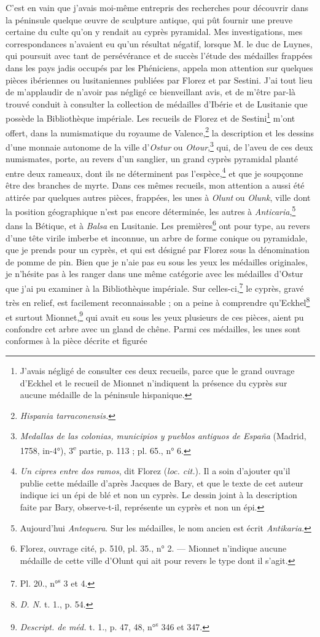 \documentclass{article}
\begin{document}
C'est en vain que j'avais moi-même entrepris des recherches pour découvrir dans la péninsule quelque œuvre de sculpture antique, qui pût fournir une preuve certaine du culte qu'on y rendait au cyprès pyramidal. Mes investigations, mes correspondances n'avaient eu qu'un résultat négatif, lorsque M. le duc de Luynes, qui poursuit avec tant de persévérance et de succès l'étude des médailles frappées dans les pays jadis occupés par les Phéniciens, appela mon attention sur quelques pièces ibériennes ou lusitaniennes publiées par Florez et par Sestini. J'ai tout lieu de m'applaudir de n'avoir pas négligé ce bienveillant avis, et de m'être par-là trouvé conduit à consulter la collection de médailles d'Ibérie et de Lusitanie que possède la Bibliothèque impériale. Les recueils de Florez et de Sestini\footnote{J'avais négligé de consulter ces deux recueils, parce que le grand ouvrage d'Eckhel et le recueil de Mionnet n'indiquent la présence du cyprès sur aucune médaille de la péninsule hispanique.} m'ont offert, dans la numismatique du royaume de Valence,\footnote{\emph{Hispania tarraconensis.}} la description et les dessins d'une monnaie autonome de la ville d'\emph{Ostur} ou \emph{Otour},\footnote{\emph{Medallas de las colonias, municipios y pueblos antiguos de España} (Madrid, 1758, in-4°), 3\textsuperscript{e} partie, p. 113 ; pl. 65., n° 6.} qui, de l'aveu de ces deux numismates, porte, au revers d'un sanglier, un grand cyprès pyramidal planté entre deux rameaux, dont ils ne déterminent pas l'espèce,\footnote{\emph{Un cipres entre dos ramos}, dit Florez (\emph{loc. cit.}). Il a soin d'ajouter qu'il publie cette médaille d'après Jacques de Bary, et que le texte de cet auteur indique ici un épi de blé et non un cyprès. Le dessin joint à la description faite par Bary, observe-t-il, représente un cyprès et non un épi.} et que je soupçonne être des branches de myrte. Dans ces mêmes recueils, mon attention a aussi été attirée par quelques autres pièces, frappées, les unes à \emph{Olunt} ou \emph{Olunk}, ville dont la position géographique n'est pas encore déterminée, les autres à \emph{Anticaria},\footnote{Aujourd'hui \emph{Antequera}. Sur les médailles, le nom ancien est écrit \emph{Antikaria}.} dans la Bétique, et à \emph{Balsa} en Lusitanie. Les premières\footnote{Florez, ouvrage cité, p. 510, pl. 35., n° 2. --- Mionnet n'indique aucune médaille de cette ville d'Olunt qui ait pour revers le type dont il s'agit.} ont pour type, au revers d'une tête virile imberbe et inconnue, un arbre de forme conique ou pyramidale, que je prends pour un cyprès, et qui est désigné par Florez sous la dénomination de pomme de pin. Bien que je n'aie pas eu sous les yeux les médailles originales, je n'hésite pas à les ranger dans une même catégorie avec les médailles d'Ostur que j'ai pu examiner à la Bibliothèque impériale. Sur celles-ci,\footnote{Pl. 20., n°\textsuperscript{s} 3 et 4.} le cyprès, gravé très en relief, est facilement reconnaissable ; on a peine à comprendre qu'Eckhel\footnote{\emph{D. N.} t. 1., p. 54.} et surtout Mionnet,\footnote{\emph{Descript. de méd.} t. 1., p. 47, 48, n°\textsuperscript{s} 346 et 347.} qui avait eu sous les yeux plusieurs de ces pièces, aient pu confondre cet arbre avec un gland de chêne. Parmi ces médailles, les unes sont conformes à la pièce décrite et figurée 
\end{document}
